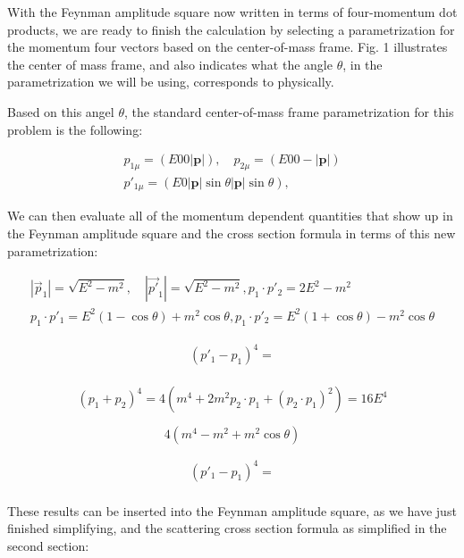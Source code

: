 \documentclass[a4]{article}
\begin{document}
    With the Feynman amplitude square now written in terms of four-momentum dot products, we are ready to finish the calculation by selecting a parametrization for the momentum four vectors
    based on the center-of-mass frame. Fig. 1 illustrates the center of mass frame, and also indicates what the angle $\theta$, in the parametrization we will be using, corresponds to physically.


    Based on this angel $\theta$, the standard center-of-mass frame parametrization for this problem is the following:

    \begin{eqnarray}
        p_{1 \mu} = (E 0 0 |\mathbf{p}|), \quad p_{2 \mu} = (E 0 0 - |\mathbf{p}|) \\
        p'_{1 \mu} = (E 0 |\mathbf{p}| \sin \theta |\mathbf{p}| \sin \theta), \quad 
    \end{eqnarray}

    We can then evaluate all of the momentum dependent quantities that show up in the Feynman amplitude square and the cross section formula in terms of this new parametrization:

    \begin{eqnarray}
        |\vec{p}_1| = \sqrt{E^2 - m^2}, \quad |\vec{p'}_1| = \sqrt{E^2 - m^2}, p_1 \cdot p'_2 = 2 E^2 - m^2 \\
        p_1 \cdot p'_1 = E^2 (1 - \cos \theta) + m^2 \cos \theta, p_1 \cdot p'_2 = E^2 (1 + \cos \theta) - m^2 \cos \theta
    \end{eqnarray}

    \begin{eqnarray}
        (p'_1 - p_1)^4 = \\
    \end{eqnarray}

    \begin{equation}
        (p_1 + p_2)^4 = 4 (m^4 + 2 m^2 p_2 \cdot p_1 + (p_2 \cdot p_1)^2) = 16 E^4
    \end{equation}

    \begin{equation}
        4 (m^4 - m^2 + m^2 \cos \theta)
    \end{equation}

    \begin{eqnarray}
        (p'_1 - p_1)^4 = \\
    \end{eqnarray}

    These results can be inserted into the Feynman amplitude square, as we have just finished simplifying, and the scattering cross section formula as simplified in the second section:
\end{document}
